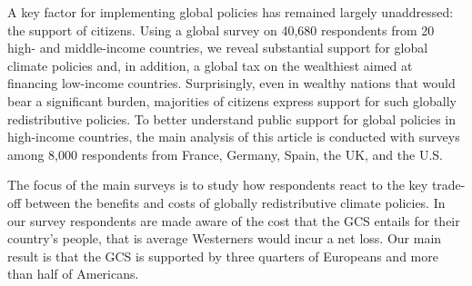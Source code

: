 \begin{bibunit}
A key factor for implementing global policies has remained largely unaddressed: the support of citizens. Using a global survey on 40,680 respondents from 20 high- and middle-income countries, we reveal substantial support for global climate policies and, in addition, a global tax on the wealthiest aimed at financing low-income countries. Surprisingly, even in wealthy nations that would bear a significant burden, majorities of citizens express support for such globally redistributive policies. To better understand public support for global policies in high-income countries, the  main analysis of this article is conducted with surveys among 8,000 respondents from France, Germany, Spain, the UK, and the U.S. 


The focus of the main surveys is to study how respondents react to the key trade-off between the benefits and costs of globally redistributive climate policies. In our survey respondents are made aware of the cost that the GCS entails for their country's people, that is average Westerners would incur a net loss. Our main result is that the GCS is supported by three quarters of Europeans and more than half of Americans. 


\end{bibunit}
